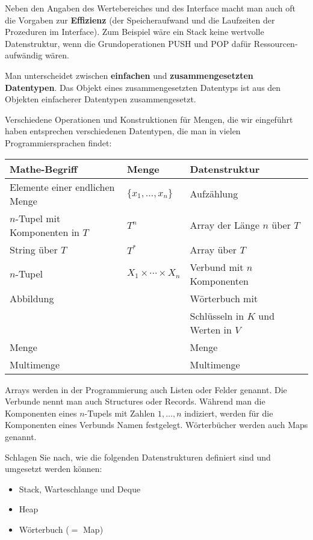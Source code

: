 \begin{bem}
	Neben den Angaben des Wertebereiches und des Interface macht man auch oft die Vorgaben zur \textbf{Effizienz} 	(der Speicheraufwand und die Laufzeiten der Prozeduren im Interface). Zum Beispiel wäre ein Stack keine wertvolle Datenstruktur, wenn die Grundoperationen PUSH und POP dafür Ressourcen-aufwändig wären. 
\end{bem} 

\begin{bem}
	Man unterscheidet zwischen \textbf{einfachen} und \textbf{zusammengesetzten Datentypen}. Das Objekt eines zusammengesetzten Datentyps ist aus den Objekten einfacherer Datentypen zusammengesetzt.  
\end{bem} 

\begin{bem}
	Verschiedene Operationen und Konstruktionen für Mengen, die wir eingeführt haben entsprechen verschiedenen Datentypen, die man in vielen Programmiersprachen findet: 
	\begin{center} 
		\small  
	\begin{tabular}{l|l|l}
			\textbf{Mathe-Begriff} & \textbf{Menge} & \textbf{Datenstruktur}
			\\ \hline 
			Elemente einer endlichen Menge & $\{x_1,\ldots,x_n\}$ & Aufzählung 
			\\ $n$-Tupel mit Komponenten in $T$ & $T^n$ & Array der Länge $n$ über $T$ 
			\\ String über $T$ & $T^\ast$ & Array über $T$
			\\ $n$-Tupel & $X_1 \times \cdots \times X_n$ & Verbund mit $n$ Komponenten
			\\ Abbildung &  & Wörterbuch mit 
			\\ & & Schlüsseln in $K$ und Werten in $V$
			\\ Menge & & Menge
			\\ Multimenge & & Multimenge 
	\end{tabular} 
	\end{center}
Arrays werden in der Programmierung auch Listen oder Felder genannt. Die Verbunde nennt man auch Structures oder Records. Während man die Komponenten eines $n$-Tupels mit Zahlen $1,\ldots,n$ indiziert, werden für die Komponenten eines Verbunds Namen festgelegt.  Wörterbücher werden auch Maps genannt. 
\end{bem} 

\begin{aufg}
	Schlagen Sie nach, wie die folgenden Datenstrukturen definiert sind und umgesetzt werden können: 
	\begin{itemize}
			\item Stack, Warteschlange und Deque
			\item Heap 
			\item Wörterbuch ($=$ Map)
	\end{itemize} 
\end{aufg} 


